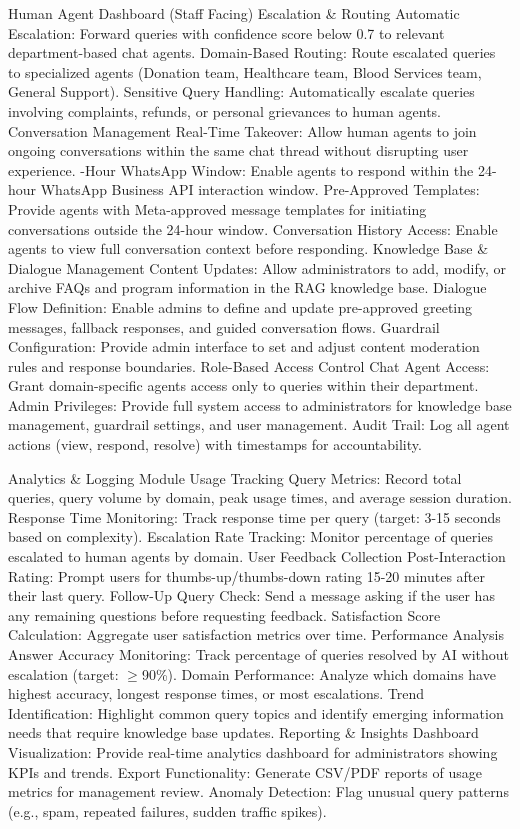 \begin{outline}
  \1 Human Agent Dashboard (Staff Facing) 
  \2 Escalation \& Routing 
  \3 Automatic Escalation: Forward queries with confidence score below 0.7 to relevant department-based chat agents.
  \3 Domain-Based Routing: Route escalated queries to specialized agents (Donation team, Healthcare team, Blood Services team, General Support). 
  \3 Sensitive Query Handling: Automatically escalate queries involving complaints, refunds, or personal grievances to human agents. 
  \2 Conversation Management
  \3 Real-Time Takeover: Allow human agents to join ongoing conversations within the same chat thread without disrupting user experience. 
  -Hour WhatsApp Window: Enable agents to respond within the 24-hour WhatsApp Business API interaction window.
  \3 Pre-Approved Templates: Provide agents with Meta-approved message templates for initiating conversations outside the 24-hour window. 
  \3 Conversation History Access: Enable agents to view full conversation context before responding. 
  \2 Knowledge Base \& Dialogue Management
  \3 Content Updates: Allow administrators to add, modify, or archive FAQs and program information in the RAG knowledge base. 
  \3 Dialogue Flow Definition: Enable admins to define and update pre-approved greeting messages, fallback responses, and guided conversation flows. 
  \3 Guardrail Configuration: Provide admin interface to set and adjust content moderation rules and response boundaries.
  \2 Role-Based Access Control 
  \3 Chat Agent Access: Grant domain-specific agents access only to queries within their department. 
  \3 Admin Privileges: Provide full system access to administrators for knowledge base management, guardrail settings, and user management. 
  \3 Audit Trail: Log all agent actions (view, respond, resolve) with timestamps for accountability. 

  \1 Analytics \& Logging Module 
  \2 Usage Tracking 
  \3 Query Metrics: Record total queries, query volume by domain, peak usage times, and average session duration. 
  \3 Response Time Monitoring: Track response time per query (target: 3-15 seconds based on complexity). 
  \3 Escalation Rate Tracking: Monitor percentage of queries escalated to human agents by domain. 
  \2 User Feedback Collection 
  \3 Post-Interaction Rating: Prompt users for thumbs-up/thumbs-down rating 15-20 minutes after their last query.
  \3 Follow-Up Query Check: Send a message asking if the user has any remaining questions before requesting feedback. 
  \3 Satisfaction Score Calculation: Aggregate user satisfaction metrics over time. 
  \2 Performance Analysis 
  \3 Answer Accuracy Monitoring: Track percentage of queries resolved by AI without escalation (target: $\geq$90\%). 
  \3 Domain Performance: Analyze which domains have highest accuracy, longest response times, or most escalations. 
  \3 Trend Identification: Highlight common query topics and identify emerging information needs that require knowledge base updates. 
  \2 Reporting \& Insights
  \3 Dashboard Visualization: Provide real-time analytics dashboard for administrators showing KPIs and trends.
  \3 Export Functionality: Generate CSV/PDF reports of usage metrics for management review. 
  \3 Anomaly Detection: Flag unusual query patterns (e.g., spam, repeated failures, sudden traffic spikes). 


\end{outline}
